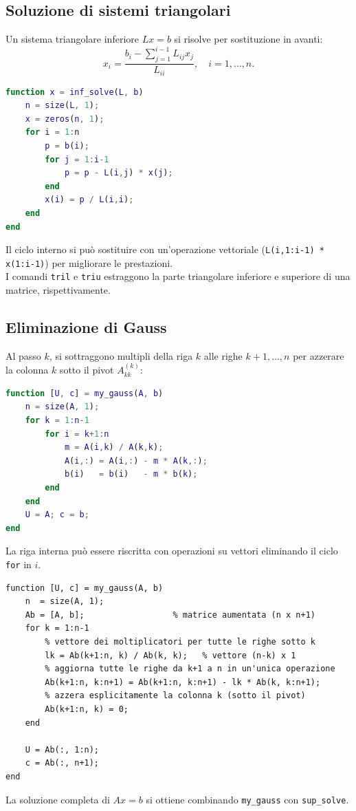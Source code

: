 \documentclass[12pt,a4paper,]{report}
\begin{document}
\subsection{Soluzione di sistemi triangolari}

Un sistema triangolare inferiore $Lx = b$ si risolve per sostituzione in avanti:
\[
  x_i = \frac{b_i - \sum_{j=1}^{i-1} L_{ij} x_j}{L_{ii}}, \quad i = 1, \ldots, n.
\]
\begin{lstlisting}[language=Matlab]
function x = inf_solve(L, b)
    n = size(L, 1);
    x = zeros(n, 1);
    for i = 1:n
        p = b(i);
        for j = 1:i-1
            p = p - L(i,j) * x(j);
        end
        x(i) = p / L(i,i);
    end
end
\end{lstlisting}
Il ciclo interno si può sostituire con un'operazione vettoriale
(\texttt{L(i,1:i-1) * x(1:i-1)}) per migliorare le prestazioni.\\
I comandi \texttt{tril} e \texttt{triu} estraggono la parte triangolare inferiore e superiore di una matrice, rispettivamente.

\subsection{Eliminazione di Gauss}

Al passo $k$, si sottraggono multipli della riga $k$ alle righe $k+1, \ldots, n$
per azzerare la colonna $k$ sotto il pivot $A^{(k)}_{kk}$:
\begin{lstlisting}[language=Matlab]
function [U, c] = my_gauss(A, b)
    n = size(A, 1);
    for k = 1:n-1
        for i = k+1:n
            m = A(i,k) / A(k,k);
            A(i,:) = A(i,:) - m * A(k,:);
            b(i)   = b(i)   - m * b(k);
        end
    end
    U = A; c = b;
end
\end{lstlisting}
La riga interna può essere riscritta con operazioni su vettori eliminando
il ciclo \texttt{for} in $i$.
\begin{lstlisting}
function [U, c] = my_gauss(A, b)
    n  = size(A, 1);
    Ab = [A, b];                  % matrice aumentata (n x n+1)
    for k = 1:n-1
        % vettore dei moltiplicatori per tutte le righe sotto k
        lk = Ab(k+1:n, k) / Ab(k, k);   % vettore (n-k) x 1
        % aggiorna tutte le righe da k+1 a n in un'unica operazione
        Ab(k+1:n, k:n+1) = Ab(k+1:n, k:n+1) - lk * Ab(k, k:n+1);
        % azzera esplicitamente la colonna k (sotto il pivot)
        Ab(k+1:n, k) = 0;
    end

    U = Ab(:, 1:n);
    c = Ab(:, n+1);
end
\end{lstlisting}
La soluzione completa di $Ax = b$ si ottiene
combinando \texttt{my\_gauss} con \texttt{sup\_solve}.
\end{document}
